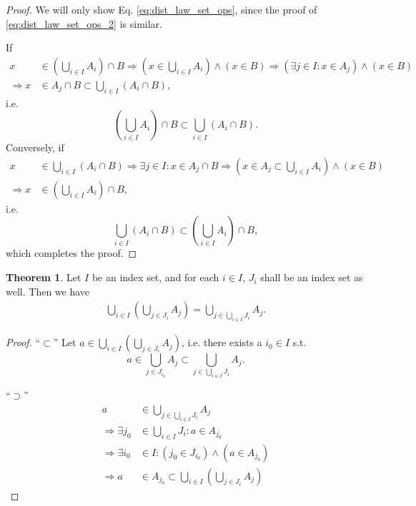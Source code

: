 \documentclass[12pt, a4paper]{article}
\numberwithin{equation}{section}
\theoremstyle{definition}
\theoremstyle{definition}
\newtheorem{theorem}[thm]{Theorem}
\begin{document}
	\begin{proof}
		We will only show Eq. \eqref{eq:dist_law_set_ops}, since the proof of \eqref{eq:dist_law_set_ops_2} is similar.
		
		If 
		\begin{align*}
			x&\in \left(\bigcup_{i\in I} A_i\right) \cap B \Rightarrow \left(x\in \bigcup_{i\in I}A_i\right) \wedge \left(x\in B\right)\Rightarrow (\exists j\in I: x\in A_j) \wedge (x\in B)
			\\ \Rightarrow x&\in A_j\cap B \subset \bigcup_{i\in I}(A_i \cap B),
		\end{align*}
		i.e. $$\left(\bigcup_{i\in I} A_i\right) \cap B \subset \bigcup_{i\in I}(A_i \cap B).$$
		Conversely, if 
		\begin{align*}
			x&\in \bigcup_{i\in I}(A_i \cap B) \Rightarrow \exists j\in I: x\in A_j \cap B\Rightarrow \left(x\in A_j\subset \bigcup_{i\in I}A_i\right) \wedge \left(x\in B\right)
			\\ \Rightarrow x &\in \left(\bigcup_{i\in I}A_i\right) \cap B,
		\end{align*}
		i.e. 
		$$\bigcup_{i\in I}(A_i \cap B) \subset \left(\bigcup_{i\in I} A_i\right) \cap B,$$
		which completes the proof.
	\end{proof}

	\begin{theorem}\label{thrm:union_of_union_of_sets}
		Let $I$ be an index set, and for each $i\in I$, $J_i$ shall be an index set as well. Then we have \cite{878108}
		\begin{align}
			\bigcup_{i\in I}\left(\bigcup_{j\in J_i}A_j\right) = \bigcup_{j\in\bigcup_{i\in I}J_i}A_j.
		\end{align}		
	\end{theorem}

	\begin{proof}
		\enquote{$\subset$} Let $a\in \bigcup_{i\in I}\left(\bigcup_{j\in J_i}A_j\right)$, i.e. there exists a $i_0\in I$ s.t. $$a\in \bigcup_{j\in J_{i_0}}A_j\subset \bigcup_{j\in \bigcup_{i\in I}J_i}A_j.$$ 
		
		\enquote{$\supset$} 
		\begin{align*}
			a&\in \bigcup_{j\in\bigcup_{i\in I}J_i}A_j 
			\\ \Rightarrow \exists j_0&\in \bigcup_{i\in I}J_i: a\in A_{j_0}
			\\ \Rightarrow \exists i_0&\in I: \left(j_0\in J_{i_0}\right) \wedge \left(a\in A_{j_0}\right)
			\\ \Rightarrow a&\in A_{j_0}\subset \bigcup_{i\in I}\left(\bigcup_{j\in J_i}A_j\right)
		\end{align*}
	\end{proof}
	
\end{document}
